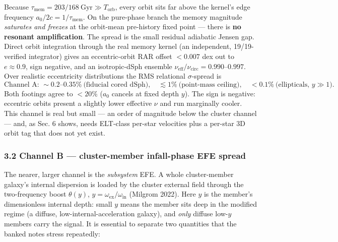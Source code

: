 \documentclass[
]{article}
\begin{document}
Because \(\tau_\mathrm{mem}=203/168\ \mathrm{Gyr}\gg T_\mathrm{orb}\), every
orbit sits far above the kernel's edge frequency
\(a_0/2c=1/\tau_\mathrm{mem}\). On the pure-phase branch the memory
magnitude \emph{saturates and freezes} at the orbit-mean pre-history
fixed point --- there is \textbf{no resonant amplification}. The spread
is the small residual adiabatic Jensen gap. Direct orbit integration
through the real memory kernel (an independent, 19/19-verified
integrator) gives an eccentric-orbit RAR offset \(<0.007\) dex out to
\(e\approx0.9\), sign negative, and an isotropic-dSph ensemble
\(\nu_\mathrm{eff}/\nu_\mathrm{circ}=0.990\)--\(0.997\). Over realistic
eccentricity distributions the RMS relational \(\sigma\)-spread is \[
\text{Channel A: } \sim0.2\text{–}0.35\%\ \text{(fiducial cored dSph)},\quad \lesssim1\%\ \text{(point-mass ceiling)},\quad <0.1\%\ \text{(ellipticals, } y\gg1).
\] Both footings agree to \(<20\%\) (\(a_0\) cancels at fixed depth
\(y\)). The sign is negative: eccentric orbits present a slightly lower
effective \(\nu\) and run marginally cooler. This channel is real but
small --- an order of magnitude below the cluster channel --- and, as
Sec. 6 shows, needs ELT-class per-star velocities plus a per-star 3D
orbit tag that does not yet exist.

\subsubsection{3.2 Channel B --- cluster-member infall-phase EFE
spread}\label{channel-b-cluster-member-infall-phase-efe-spread}

The nearer, larger channel is the \emph{subsystem} EFE. A whole
cluster-member galaxy's internal dispersion is loaded by the cluster
external field through the two-frequency boost \(\theta(y)\),
\(y=\omega_\mathrm{ex}/\omega_\mathrm{in}\) (Milgrom 2022). Here \(y\) is the
member's dimensionless internal depth: small \(y\) means the member sits
deep in the modified regime (a diffuse, low-internal-acceleration
galaxy), and \emph{only} diffuse low-\(y\) members carry the signal. It
is essential to separate two quantities that the banked notes stress
repeatedly:
\end{document}
